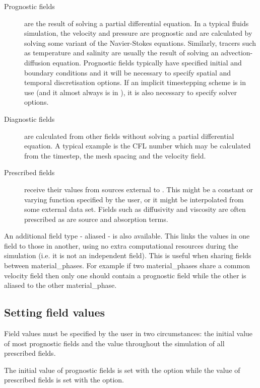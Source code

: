 \begin{description}
\item[Prognostic fields] are the result of solving a partial differential
  equation. In a typical fluids simulation, the velocity and pressure are
  prognostic and are calculated by solving some variant of the Navier-Stokes
  equations. Similarly, tracers such as temperature and salinity are usually
  the result of solving an advection-diffusion equation. Prognostic fields
  typically have specified initial and boundary conditions and it will be
  necessary to specify spatial and temporal discretisation options. If an
  implicit timestepping scheme is in use (and it almost always is in
  \fluidity), it is also necessary to specify solver options.
\item[Diagnostic fields] are calculated from other fields without solving a
  partial differential equation. A typical example is the CFL number which
  may be calculated from the timestep, the mesh spacing and the velocity
  field.
\item[Prescribed fields] receive their values from sources external to
  \fluidity. This might be a constant or varying function specified by the
  user, or it might be interpolated from some external data set. Fields such
  as diffusivity and viscosity are often prescribed as are source and
  absorption terms.
\end{description}

An additional field type - aliased - is also available.  This links the values in one field to those in another, using no extra computational resources during the simulation (i.e. it is not an independent field).  This is useful when sharing fields between material\_phases.  For example if two material\_phases share a common velocity field then only one should contain a prognostic field while the other is aliased to the other material\_phase.

\subsection{Setting field values}\label{sec:setting_field_values}
Field values must be specified by the user in two circumstances: the initial
value of most prognostic fields and the value throughout the simulation of
all prescribed fields.

The initial value of prognostic fields is set with the
 option while the value of
prescribed fields is set with the  option.


